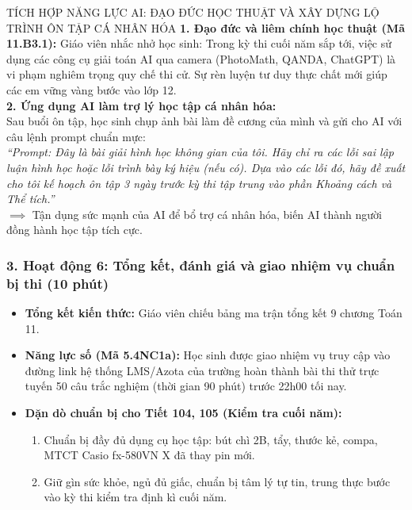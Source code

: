 \documentclass[12pt, a4paper]{article}
\begin{document}
\begin{aibox}{TÍCH HỢP NĂNG LỰC AI: ĐẠO ĐỨC HỌC THUẬT VÀ XÂY DỰNG LỘ TRÌNH ÔN TẬP CÁ NHÂN HÓA}
\textbf{1. Đạo đức và liêm chính học thuật (Mã 11.B3.1):} Giáo viên nhắc nhở học sinh: Trong kỳ thi cuối năm sắp tới, việc sử dụng các công cụ giải toán AI qua camera (PhotoMath, QANDA, ChatGPT) là vi phạm nghiêm trọng quy chế thi cử. Sự rèn luyện tư duy thực chất mới giúp các em vững vàng bước vào lớp 12.\\
\textbf{2. Ứng dụng AI làm trợ lý học tập cá nhân hóa:}\\
Sau buổi ôn tập, học sinh chụp ảnh bài làm đề cương của mình và gửi cho AI với câu lệnh prompt chuẩn mực:\\
\textit{``Prompt: Đây là bài giải hình học không gian của tôi. Hãy chỉ ra các lỗi sai lập luận hình học hoặc lỗi trình bày ký hiệu (nếu có). Dựa vào các lỗi đó, hãy đề xuất cho tôi kế hoạch ôn tập 3 ngày trước kỳ thi tập trung vào phần Khoảng cách và Thể tích.''}\\
$\implies$ Tận dụng sức mạnh của AI để bổ trợ cá nhân hóa, biến AI thành người đồng hành học tập tích cực.
\end{aibox}

\subsubsection*{3. Hoạt động 6: Tổng kết, đánh giá và giao nhiệm vụ chuẩn bị thi (10 phút)}
\begin{itemize}[leftmargin=0.6cm]
    \item \textbf{Tổng kết kiến thức:} Giáo viên chiếu bảng ma trận tổng kết 9 chương Toán 11.
    \item \textbf{Năng lực số (Mã 5.4NC1a):} Học sinh được giao nhiệm vụ truy cập vào đường link hệ thống LMS/Azota của trường hoàn thành bài thi thử trực tuyến 50 câu trắc nghiệm (thời gian 90 phút) trước 22h00 tối nay.
    \item \textbf{Dặn dò chuẩn bị cho Tiết 104, 105 (Kiểm tra cuối năm):}
    \begin{enumerate}
        \item Chuẩn bị đầy đủ dụng cụ học tập: bút chì 2B, tẩy, thước kẻ, compa, MTCT Casio fx-580VN X đã thay pin mới.
        \item Giữ gìn sức khỏe, ngủ đủ giấc, chuẩn bị tâm lý tự tin, trung thực bước vào kỳ thi kiểm tra định kì cuối năm.
    \end{enumerate}
\end{itemize}
\end{document}
